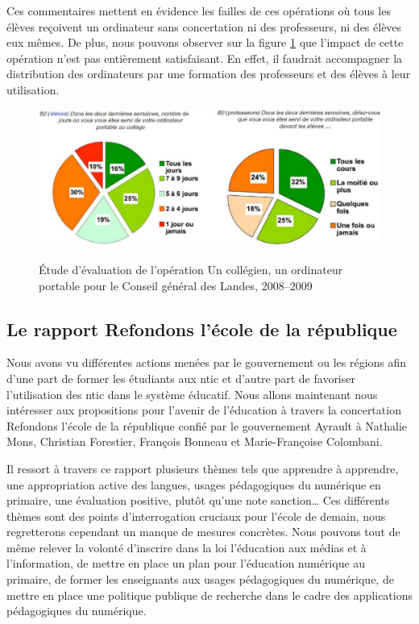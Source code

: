 Ces commentaires mettent en évidence les failles de ces opérations où tous les élèves reçoivent un ordinateur sans concertation ni des professeurs, ni des élèves eux mêmes. De plus, nous pouvons observer sur la figure \ref{graph_op_portables} que l'impact de cette opération n'est pas entièrement satisfaisant. En effet, il faudrait accompagner la distribution des ordinateurs par une formation des professeurs et des élèves à leur utilisation.
\begin{figure}[H]
	\begin{center}
		\includegraphics[width=\textwidth]{../resources/illustrations/usage_portables_without_caption}
	\label{graph_op_portables}
	\caption{Étude d'évaluation de l'opération \og Un collégien, un ordinateur portable \fg{} pour le Conseil général des Landes, 2008--2009}
	\end{center}
\end{figure}


\subsection{Le rapport \og{}Refondons l'école de la république\fg{}}

Nous avons vu différentes actions menées par le gouvernement ou les régions afin d'une part de former les étudiants aux \gls{ntic} et d'autre part de favoriser l'utilisation des \gls{ntic} dans le système éducatif. Nous allons maintenant nous intéresser aux propositions pour l'avenir de l'éducation à travers la concertation \og{}Refondons l'école de la république\fg{} confié par le gouvernement Ayrault à Nathalie Mons, Christian Forestier, François Bonneau et Marie-Françoise Colombani. 

Il ressort à travers ce rapport plusieurs thèmes tels que \og{}apprendre à apprendre\fg{}, \og{}une appropriation active des langues\fg{}, \og{}usages pédagogiques du numérique en primaire\fg{}, \og{}une évaluation positive, plutôt qu'une note sanction\fg{}… Ces différents thèmes sont des points d'interrogation cruciaux pour l'école de demain, nous regretterons cependant un manque de mesures concrètes. Nous pouvons tout de même relever la volonté d'inscrire dans la loi \og l'éducation aux médias et à l'information\fg{}, de mettre en place un plan pour l'éducation numérique au primaire, de former les enseignants aux usages pédagogiques du numérique, de mettre en place une politique publique de recherche dans le cadre des applications pédagogiques du numérique.


